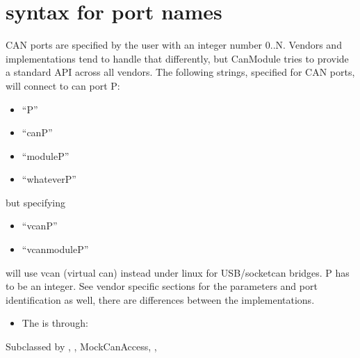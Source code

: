 \documentclass[a4paper,10pt,english]{sphinxmanual}
\begin{document}
\section{syntax for port names}
\label{\detokenize{canports:syntax-for-port-names}}
CAN ports are specified by the user with an integer number 0..N.
Vendors and implementations tend to handle that differently, but CanModule tries to provide a
standard API across all vendors. The following strings, specified for CAN ports, will connect
to can port P:
\begin{itemize}
\item {} 
“P”

\item {} 
“canP”

\item {} 
“moduleP”

\item {} 
“whateverP”

\end{itemize}

but specifying
\begin{itemize}
\item {} 
“vcanP”

\item {} 
“vcanmoduleP”

\end{itemize}

will use vcan (virtual can) instead under linux for USB/socketcan bridges. P has to be an integer.
See vendor specific sections for the parameters and port identification as well, there are differences between
the implementations.
\begin{itemize}
\item {} 
The  is through:

\end{itemize}

\begin{fulllineitems}
\label{\detokenize{canports:_CPPv4N9CanModule10CCanAccessE}}%
\pysigstartmultiline
{}%
\pysigstopmultiline
Subclassed by {\hyperref[\detokenize{vendors/anagate:classAnaCanScan}]{}}, {\hyperref[\detokenize{vendors/systec:classCSockCanScan}]{}}, MockCanAccess, {\hyperref[\detokenize{vendors/peak:classPKCanScan}]{}}, {\hyperref[\detokenize{vendors/systec:classSTCanScan}]{}}

\end{fulllineitems}
\end{document}
